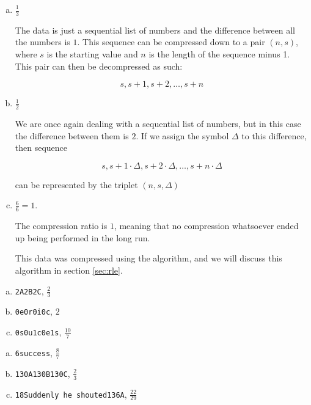 \begin{Answer}[ref={compression-ratio}]

  \begin{enumerate}[(a)]
  \item $\frac{1}{3}$

    The data is just a sequential list of numbers and the difference
    between all the numbers is $1$. This sequence can be compressed
    down to a pair $(n,s)$, where $s$ is the starting value and $n$ is
    the length of the sequence minus 1. This pair can then be decompressed
    as such:

    \begin{equation*}
     s,s+1,s+2,\dots,s+n
    \end{equation*}

  \item $\frac{1}{2}$

    We are once again dealing with a sequential list of numbers, but
    in this case the difference between them is $2$. If we assign the
    symbol $\Delta$ to this difference, then sequence

    \begin{equation*}
      s, s + 1 \cdot \Delta, s + 2 \cdot \Delta, \dots, s + n \cdot \Delta
    \end{equation*}

    can be represented by the triplet $(n,s,\Delta)$

  \item $\frac{6}{6} = 1$.

    The compression ratio is $1$, meaning that no compression
    whatsoever ended up being performed in the long run.

    This data was compressed using the \rle algorithm, and we will
    discuss this algorithm in section \ref{sec:rle}.

  \end{enumerate}
\end{Answer}

\begin{Answer}[ref={rle-compression}]

  \begin{enumerate}[(a)]
  \item \texttt{2A2B2C}, $\frac{2}{3}$
  \item \texttt{0e0r0i0c}, $2$
  \item \texttt{0s0u1c0e1s}, $\frac{10}{7}$
  \end{enumerate}

\end{Answer}

\begin{Answer}[ref={packbits-rle}]

  \begin{enumerate}[(a)]
  \item \texttt{6success}, $\frac{8}{7}$
  \item \texttt{130A130B130C}, $\frac{2}{3}$
  \item \texttt{18Suddenly he shouted136A}, $\frac{22}{29}$
  \end{enumerate}

\end{Answer}

